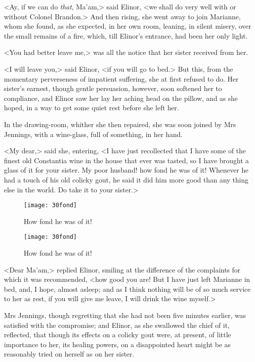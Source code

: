 <Ay, if we can do \textit{that}, Ma'am,> said Elinor, <we shall do very well with or without Colonel Brandon.> And then rising, she went away to join Marianne, whom she found, as she expected, in her own room, leaning, in silent misery, over the small remains of a fire, which, till Elinor's entrance, had been her only light.

<You had better leave me,> was all the notice that her sister received from her.

<I will leave you,> said Elinor, <if you will go to bed.> But this, from the momentary perverseness of impatient suffering, she at first refused to do. Her sister's earnest, though gentle persuasion, however, soon softened her to compliance, and Elinor saw her lay her aching head on the pillow, and as she hoped, in a way to get some quiet rest before she left her.

In the drawing-room, whither she then repaired, she was soon joined by Mrs Jennings, with a wine-glass, full of something, in her hand.

<My dear,> said she, entering, <I have just recollected that I have some of the finest old Constantia wine in the house that ever was tasted, so I have brought a glass of it for your sister. My poor husband! how fond he was of it! Whenever he had a touch of his old colicky gout, he said it did him more good than any thing else in the world. Do take it to your sister.>


\begin{a4}
	\begin{figure}[tbph]
		\centering
		\texttt{[image: 30fond]}
		\caption{How fond he was of it!}
	\end{figure}
\end{a4}

\begin{letter}
	\begin{figure}[tbph]
		\centering
		\texttt{[image: 30fond]}
		\caption{How fond he was of it!}
	\end{figure}
\end{letter}



<Dear Ma'am,> replied Elinor, smiling at the difference of the complaints for which it was recommended, <how good you are! But I have just left Marianne in bed, and, I hope, almost asleep; and as I think nothing will be of so much service to her as rest, if you will give me leave, I will drink the wine myself.>

Mrs Jennings, though regretting that she had not been five minutes earlier, was satisfied with the compromise; and Elinor, as she swallowed the chief of it, reflected, that though its effects on a colicky gout were, at present, of little importance to her, its healing powers, on a disappointed heart might be as reasonably tried on herself as on her sister.

